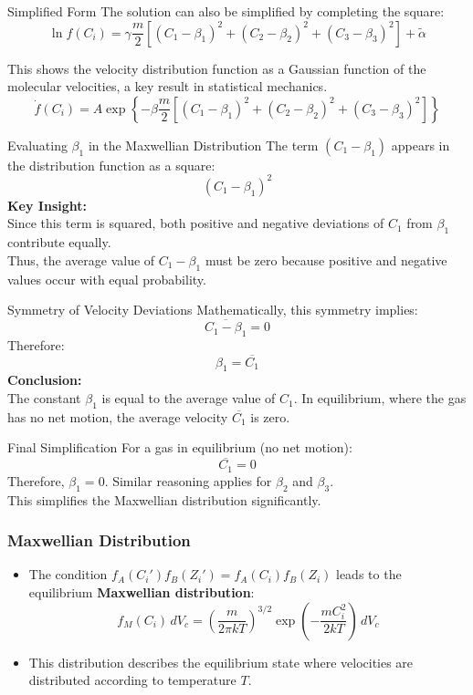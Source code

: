 \documentclass{beamer}
\begin{document}
\begin{frame}{Simplified Form}
    The solution can also be simplified by completing the square:
    \[
    \ln f(C_i) = \gamma \frac{m}{2} \left[ (C_1 - \beta_1)^2 + (C_2 - \beta_2)^2 + (C_3 - \beta_3)^2 \right] + \tilde{\alpha}
    \]
    
    This shows the velocity distribution function as a Gaussian function of the molecular velocities, a key result in statistical mechanics.
$$
    \dot{f}\left(C_i\right)=A \exp \left\{-\beta \frac{m}{2}\left[\left(C_1-\beta_1\right)^2+\left(C_2-\beta_2\right)^2+\left(C_3 -\beta_3\right)^2\right]\right\}
    $$
\end{frame}

\begin{frame}{Evaluating \( \beta_1 \) in the Maxwellian Distribution}
    The term \( (C_1 - \beta_1) \) appears in the distribution function as a square:
    \[
    (C_1 - \beta_1)^2
    \]
    \textbf{Key Insight:} \\
    Since this term is squared, both positive and negative deviations of \( C_1 \) from \( \beta_1 \) contribute equally. \\
    \vspace{0.4cm}
    Thus, the average value of \( C_1 - \beta_1 \) must be zero because positive and negative values occur with equal probability.
\end{frame}

\begin{frame}{Symmetry of Velocity Deviations}
    Mathematically, this symmetry implies:
    \[
    \overline{C_1 - \beta_1} = 0
    \]
    Therefore:
    \[
    \beta_1 = \overline{C_1}
    \]
    \vspace{0.4cm}
    \textbf{Conclusion:} \\
    The constant \( \beta_1 \) is equal to the average value of \( C_1 \). In equilibrium, where the gas has no net motion, the average velocity \( \overline{C_1} \) is zero.
\end{frame}

\begin{frame}{Final Simplification}
    For a gas in equilibrium (no net motion):
    \[
    \overline{C_1} = 0
    \]
    Therefore, \( \beta_1 = 0 \). Similar reasoning applies for \( \beta_2 \) and \( \beta_3 \).\\
    This simplifies the Maxwellian distribution significantly.
\end{frame}

\begin{frame}
\frametitle{Maxwellian Distribution}
\begin{itemize}
    \item The condition \( f_A(C_i') f_B(Z_i') = f_A(C_i) f_B(Z_i) \) leads to the equilibrium {\bf Maxwellian distribution}:
    \[
    f_M(C_i) \, dV_c = \left( \frac{m}{2\pi k T} \right)^{3/2} \exp \left( - \frac{m C_i^2}{2 k T} \right) \, dV_c
    \]
    \item This distribution describes the equilibrium state where velocities are distributed according to temperature \( T \).
\end{itemize}
\end{frame}
\end{document}
